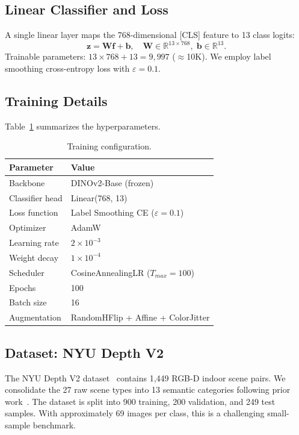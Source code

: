 \documentclass[conference, a4paper]{IEEEtran}
\begin{document}
\subsection{Linear Classifier and Loss}

A single linear layer maps the 768-dimensional [CLS] feature to 13 class logits:
\[
\mathbf{z} = \mathbf{W} \mathbf{f} + \mathbf{b},\quad
\mathbf{W} \in \mathbb{R}^{13 \times 768},\; \mathbf{b} \in \mathbb{R}^{13}.
\]
Trainable parameters: $13 \times 768 + 13 = 9{,}997$ ($\approx$10K).
We employ label smoothing cross-entropy loss with $\varepsilon = 0.1$.

\subsection{Training Details}

Table~\ref{tab:training_config} summarizes the hyperparameters.

\begin{table}[htb]
    \centering
    \caption{Training configuration.}
    \label{tab:training_config}
    \small
    \begin{tabular}{lp{5cm}}
        \toprule
        \textbf{Parameter} & \textbf{Value} \\
        \midrule
        Backbone & DINOv2-Base (frozen) \\
        Classifier head & Linear(768, 13) \\
        Loss function & Label Smoothing CE ($\varepsilon=0.1$) \\
        Optimizer & AdamW \\
        Learning rate & $2 \times 10^{-3}$ \\
        Weight decay & $1 \times 10^{-4}$ \\
        Scheduler & CosineAnnealingLR ($T_{max}=100$) \\
        Epochs & 100 \\
        Batch size & 16 \\
        Augmentation & RandomHFlip + Affine + ColorJitter \\
        \bottomrule
    \end{tabular}
\end{table}

\subsection{Dataset: NYU Depth V2}

The NYU Depth V2 dataset~\cite{nyu_depth} contains 1,449 RGB-D indoor scene pairs.
We consolidate the 27 raw scene types into 13 semantic categories following
prior work~\cite{wang2016depth, gupta2014indoor}.
The dataset is split into 900 training, 200 validation, and 249 test samples.
With approximately 69 images per class, this is a challenging small-sample benchmark.
\end{document}
